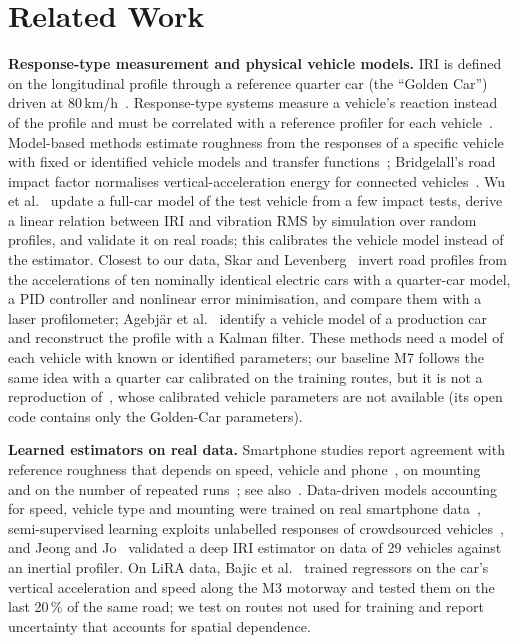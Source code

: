 \section{Related Work}
\label{sec:related}

\textbf{Response-type measurement and physical vehicle models.}
IRI is defined on the longitudinal profile through a reference quarter car (the ``Golden Car'') driven at 80\,km/h~\cite{sayers1986tp45,sayers1995iri,astm_e1926}.
Response-type systems measure a vehicle's reaction instead of the profile and must be correlated with a reference profiler for each vehicle~\cite{sayers1986tp46}.
Model-based methods estimate roughness from the responses of a specific vehicle with fixed or identified vehicle models and transfer functions~\cite{gonzalez2008accel,zhao2017freq}; Bridgelall's road impact factor normalises vertical-acceleration energy for connected vehicles~\cite{bridgelall2014rif}.
Wu et al.~\cite{wu2023calib} update a full-car model of the test vehicle from a few impact tests, derive a linear relation between IRI and vibration RMS by simulation over random profiles, and validate it on real roads; this calibrates the vehicle model instead of the estimator.
Closest to our data, Skar and Levenberg~\cite{skar2024inversion} invert road profiles from the accelerations of ten nominally identical electric cars with a quarter-car model, a PID controller and nonlinear error minimisation, and compare them with a laser profilometer; Agebj\"ar et al.~\cite{agebjar2025fusion} identify a vehicle model of a production car and reconstruct the profile with a Kalman filter.
These methods need a model of each vehicle with known or identified parameters; our baseline M7 follows the same idea with a quarter car calibrated on the training routes, but it is not a reproduction of~\cite{skar2024inversion}, whose calibrated vehicle parameters are not available (its open code contains only the Golden-Car parameters).

\textbf{Learned estimators on real data.}
Smartphone studies report agreement with reference roughness that depends on speed, vehicle and phone~\cite{thilak2021}, on mounting~\cite{mounting2026} and on the number of repeated runs~\cite{opara2022roughness}; see also~\cite{hanson2014iri,sattar2018review,evalframework2023}.
Data-driven models accounting for speed, vehicle type and mounting were trained on real smartphone data~\cite{sang2024iri}, semi-supervised learning exploits unlabelled responses of crowdsourced vehicles~\cite{zhang2026semisup,trc2021crowd}, and Jeong and Jo~\cite{jeongjo2024irinet} validated a deep IRI estimator on data of 29 vehicles against an inertial profiler.
On LiRA data, Bajic et al.~\cite{bajic2021ml} trained regressors on the car's vertical acceleration and speed along the M3 motorway and tested them on the last 20\,\% of the same road; we test on routes not used for training and report uncertainty that accounts for spatial dependence.

